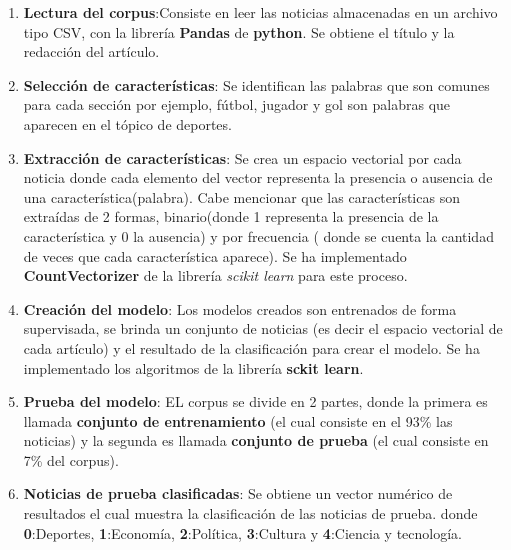 \begin{enumerate}

	\item \textbf{Lectura del corpus}:Consiste en leer las noticias almacenadas en un archivo tipo CSV, con la librería \textbf{Pandas} de \textbf{python}. Se obtiene el título y la redacción del artículo.

	\item \textbf{Selección de características}: Se identifican las palabras que son comunes para cada sección por ejemplo, fútbol, jugador y gol son palabras que aparecen en el tópico de deportes. 

	\item \textbf{Extracción de características}: Se crea un espacio vectorial por cada noticia donde cada elemento del vector representa la presencia o ausencia de una característica(palabra). Cabe mencionar que las características son extraídas de 2 formas, binario(donde 1 representa la presencia de la característica y 0 la ausencia) y por frecuencia ( donde se cuenta la cantidad de veces que cada característica aparece). Se ha implementado \textbf{CountVectorizer} de la librería \textit{scikit learn} para este proceso.

	\item \textbf{Creación del modelo}: Los modelos creados son entrenados de forma supervisada, se brinda un conjunto de noticias (es decir el espacio vectorial de cada artículo) y el resultado de la clasificación para crear el modelo. Se ha implementado los algoritmos de la librería \textbf{sckit learn}.

	\item \textbf{Prueba del modelo}: EL corpus se divide en 2 partes, donde la primera es llamada \textbf{conjunto de entrenamiento} (el cual consiste en el 93\% las noticias) y la segunda es llamada \textbf{conjunto de prueba} (el cual consiste en 7\% del corpus).

	\item \textbf{Noticias de prueba clasificadas}: Se obtiene un vector numérico de resultados el cual muestra la clasificación de las noticias de prueba. donde \textbf{0}:Deportes, \textbf{1}:Economía, \textbf{2}:Política, \textbf{3}:Cultura y \textbf{4}:Ciencia y tecnología.
	

\end{enumerate}


